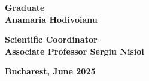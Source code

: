 \begin{titlepage}
    \vspace{3cm}
    
    \begin{center}
    \large \textbf{Graduate \\ Anamaria Hodivoianu}
    \end{center}
    
    \vspace{0.25cm}
    
    \begin{center}
    \large \textbf{Scientific Coordinator \\ Associate Professor Sergiu Nisioi}
    \end{center}
    
    \vspace{2cm}
    
    \begin{center}
    \Large \textbf{Bucharest, June 2025}
    \end{center}
\end{titlepage}